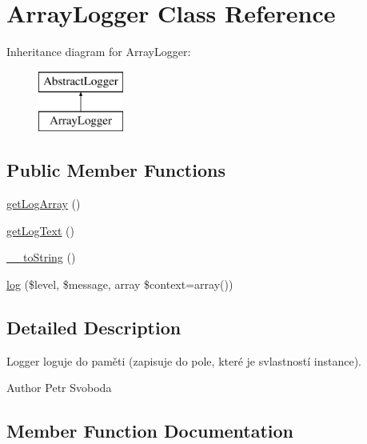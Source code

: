 \hypertarget{class_pes_1_1_logger_1_1_array_logger}{}\section{Array\+Logger Class Reference}
\label{class_pes_1_1_logger_1_1_array_logger}
Inheritance diagram for Array\+Logger\+:\begin{figure}[H]
\begin{center}
\leavevmode
\includegraphics[height=2.000000cm]{class_pes_1_1_logger_1_1_array_logger}
\end{center}
\end{figure}
\subsection*{Public Member Functions}
\begin{DoxyCompactItemize}
\item 
\mbox{\hyperlink{class_pes_1_1_logger_1_1_array_logger_a755a9b9ee8a5044e162a9fd2a0b2a55c}{get\+Log\+Array}} ()
\item 
\mbox{\hyperlink{class_pes_1_1_logger_1_1_array_logger_af6241fe7e24b92b848c0341d8e134211}{get\+Log\+Text}} ()
\item 
\mbox{\hyperlink{class_pes_1_1_logger_1_1_array_logger_a7516ca30af0db3cdbf9a7739b48ce91d}{\+\_\+\+\_\+to\+String}} ()
\item 
\mbox{\hyperlink{class_pes_1_1_logger_1_1_array_logger_a142f6bf4e86dc16e0bae4cff1de0dd44}{log}} (\$level, \$message, array \$context=array())
\end{DoxyCompactItemize}


\subsection{Detailed Description}
Logger loguje do paměti (zapisuje do pole, které je svlastností instance). \begin{DoxyAuthor}{Author}
Petr Svoboda 
\end{DoxyAuthor}


\subsection{Member Function Documentation}
\mbox{\label{class_pes_1_1_logger_1_1_array_logger_a7516ca30af0db3cdbf9a7739b48ce91d}} 
